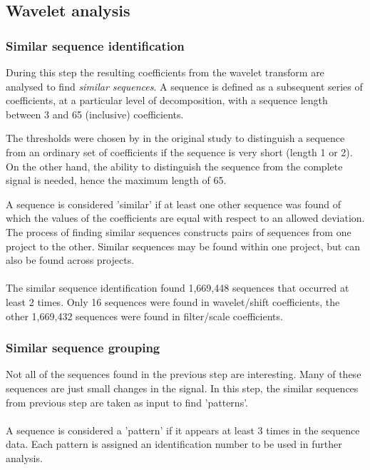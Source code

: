 \subsection{Wavelet analysis}
\subsubsection{Similar sequence identification}
During this step the resulting coefficients from the wavelet transform are
analysed to find \emph{similar sequences}\rm. A sequence is defined as a
subsequent series of coefficients, at a particular level of decomposition, with
a sequence length between 3 and 65 (inclusive) coefficients.

The thresholds were chosen by \citet{karus2013} in the original study to
distinguish a sequence from an ordinary set of coefficients if the sequence is
very short (length 1 or 2). On the other hand, the ability to distinguish the
sequence from the complete signal is needed, hence the maximum length of 65.

A sequence is considered 'similar' if at least one other sequence was found of
which the values of the coefficients are equal with respect to an allowed
deviation. The process of finding similar sequences constructs pairs of
sequences from one project to the other. Similar sequences may be found within
one project, but can also be found across projects. 

\paragraph{}
The similar sequence identification found 1,669,448 sequences that occurred
at least 2 times. Only 16 sequences were found in wavelet/shift coefficients,
the other 1,669,432 sequences were found in filter/scale coefficients.

\subsubsection{Similar sequence grouping}
\label{def:pattern}
Not all of the sequences found in the previous step are interesting. Many of
these sequences are just small changes in the signal. In this step, the similar
sequences from previous step are taken as input to find 'patterns'.

\paragraph{}
A sequence is considered a 'pattern' if it appears at least 3 times in the
sequence data. Each pattern is assigned an identification number to be used in
further analysis.


